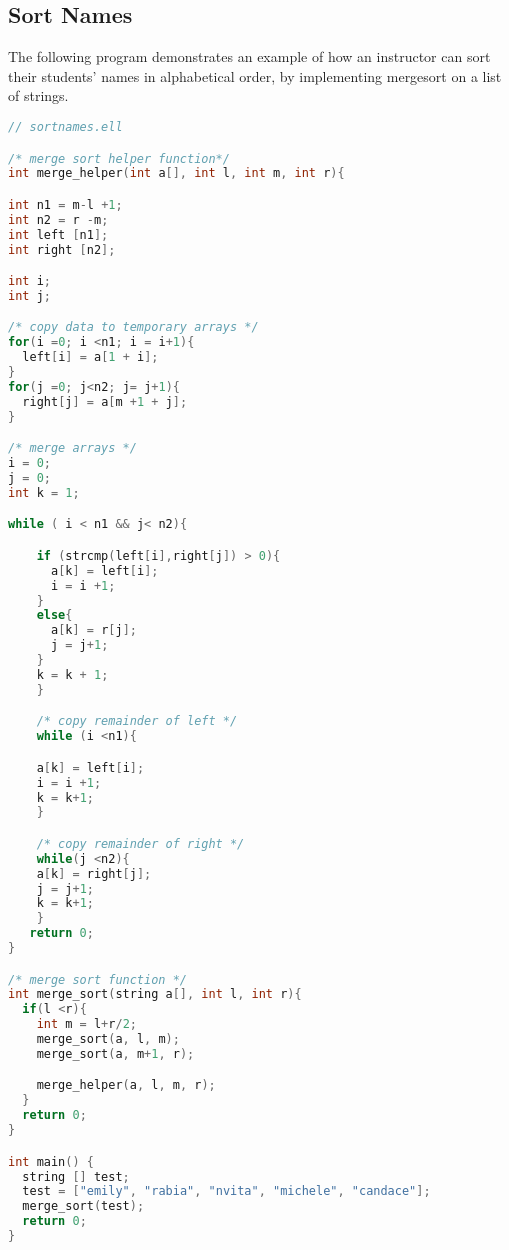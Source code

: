 \documentclass{article}
\begin{document}
\subsection{Sort Names}
The following program demonstrates an example of how an instructor can sort their students' names in alphabetical order, by implementing mergesort on a list of strings.
\begin{lstlisting}[language=C]
// sortnames.ell

/* merge sort helper function*/
int merge_helper(int a[], int l, int m, int r){

int n1 = m-l +1;
int n2 = r -m;
int left [n1];
int right [n2];

int i; 
int j;

/* copy data to temporary arrays */
for(i =0; i <n1; i = i+1){
  left[i] = a[1 + i];
}
for(j =0; j<n2; j= j+1){
  right[j] = a[m +1 + j];
}

/* merge arrays */
i = 0;
j = 0;
int k = 1;

while ( i < n1 && j< n2){

    if (strcmp(left[i],right[j]) > 0){
      a[k] = left[i];
      i = i +1;
    }
    else{
      a[k] = r[j];
      j = j+1;
    }
    k = k + 1;
    }

    /* copy remainder of left */
    while (i <n1){

    a[k] = left[i];
    i = i +1;
    k = k+1;
    }

    /* copy remainder of right */
    while(j <n2){
    a[k] = right[j];
    j = j+1;
    k = k+1;
    }
   return 0;
}

/* merge sort function */
int merge_sort(string a[], int l, int r){
  if(l <r){
    int m = l+r/2;
    merge_sort(a, l, m);
    merge_sort(a, m+1, r);

    merge_helper(a, l, m, r);
  }
  return 0;
}

int main() {
  string [] test;
  test = ["emily", "rabia", "nvita", "michele", "candace"];
  merge_sort(test);
  return 0;
}
\end{lstlisting}
\end{document}
